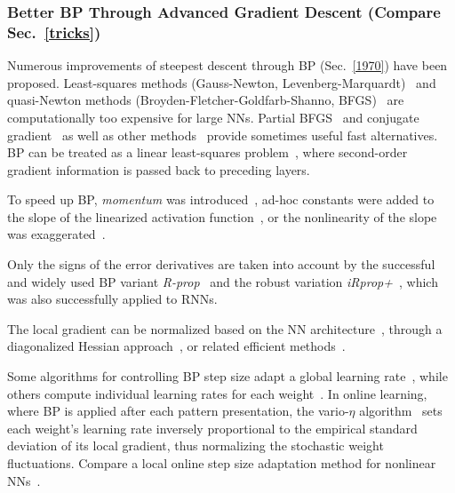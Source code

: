 \documentclass[letterpaper]{article}
\begin{document}
\begin{CJK*}{UTF8}{gbsn}
\begin{sloppypar}


\subsubsection{Better BP Through Advanced Gradient Descent (Compare Sec.~\ref{tricks})}
\label{betterbp}

Numerous improvements of steepest descent through BP (Sec.~\ref{1970}) have been proposed.
Least-squares methods (Gauss-Newton, Levenberg-Marquardt)~\citep{gauss1809,newton1687,levenberg1944,marquardt1963,schaback1992}
and quasi-Newton methods (Broyden-Fletcher-Goldfarb-Shanno, 
BFGS)~\citep{broyden1965,fletcher1963,goldfarb1970,shanno1970}
are computationally too expensive for large NNs.
Partial BFGS~\citep{Battiti:92,Saito:1997} and
conjugate gradient~\citep{HestenesStiefel:1952,Moller:93} 
as well as other methods~\citep{Solla:88,Schmidhuber:89-1,Cauwenberghs:93}
provide sometimes useful fast alternatives.
BP can be treated 
as a linear least-squares problem~\citep{Biegler:93}, where
second-order gradient information is passed back to preceding layers.

To speed up BP, {\em momentum} was introduced~\citep{Rumelhart:86},
ad-hoc constants were added to the slope of the linearized activation
function~\citep{Fahlman:88}, or the
nonlinearity of the slope was exaggerated~\citep{westsaad:96}.

Only the signs of the error derivatives are taken into account by the successful 
and widely used BP variant {\em R-prop}~\citep{rprop93}
and the robust variation {\em iRprop+}~\citep{igel:01},
which was also successfully applied to RNNs.

The local gradient can be normalized based 
on the NN architecture~\citep{Schraudolph:96}, 
through a diagonalized Hessian approach~\citep{Becker:89},
or related efficient methods~\citep{schraudolph02}.


Some algorithms for controlling BP step size
adapt a global learning rate~\citep{Lapedes:86a,Vogl:88,Battiti:89,lecun-simard-pearlmutter-93,Yu:1995},
while others compute individual learning rates for each
weight~\citep{Jacobs:88,SilvaAlmeida:1990}.
In online learning, where BP is applied after each pattern presentation,
the vario-$\eta$ algorithm~\citep{DBLP:conf/nips/NeuneierZ96} sets each weight's learning rate inversely proportional to the empirical standard deviation of its
local gradient, thus normalizing the stochastic weight fluctuations.
Compare a local online step size adaptation method for nonlinear NNs~\citep{Almeida:97}.


\end{sloppypar}
\end{CJK*}
\end{document}
